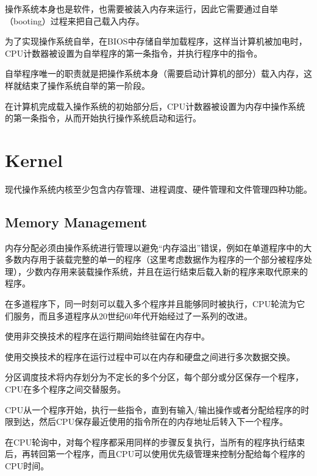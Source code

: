 操作系统本身也是软件，也需要被装入内存来运行，因此它需要通过自举（booting）过程来把自己载入内存。

为了实现操作系统自举，在BIOS中存储自举加载程序，这样当计算机被加电时，CPU计数器被设置为自举程序的第一条指令，并执行程序中的指令。

自举程序唯一的职责就是把操作系统本身（需要启动计算机的部分）载入内存，这样就结束了操作系统自举的第一阶段。

在计算机完成载入操作系统的初始部分后，CPU计数器被设置为内存中操作系统的第一条指令，从而开始执行操作系统启动和运行。



\section{Kernel}


现代操作系统内核至少包含内存管理、进程调度、硬件管理和文件管理四种功能。


\subsection{Memory Management}


内存分配必须由操作系统进行管理以避免“内存溢出”错误，例如在单道程序中的大多数内存用于装载完整的单一的程序（这里考虑数据作为程序的一个部分被程序处理），少数内存用来装载操作系统，并且在运行结束后载入新的程序来取代原来的程序。

在多道程序下，同一时刻可以载入多个程序并且能够同时被执行，CPU轮流为它们服务，而且多道程序从20世纪60年代开始经过了一系列的改进。

\begin{compactitem}
\item 使用非交换技术的程序在运行期间始终驻留在内存中。


\item 使用交换技术的程序在运行过程中可以在内存和硬盘之间进行多次数据交换。

\end{compactitem}

分区调度技术将内存划分为不定长的多个分区，每个部分或分区保存一个程序，CPU在多个程序之间交替服务。

CPU从一个程序开始，执行一些指令，直到有输入/输出操作或者分配给程序的时限到达，然后CPU保存最近使用的指令所在的内存地址后转入下一个程序。

在CPU轮询中，对每个程序都采用同样的步骤反复执行，当所有的程序执行结束后，再转回第一个程序，而且CPU可以使用优先级管理来控制分配给每个程序的CPU时间。

